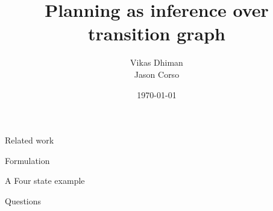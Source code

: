 \documentclass[10pt, compress]{beamer}
\title{Planning as inference over transition graph}
\date{\today}
\author{Vikas Dhiman \\ Jason Corso}
\institute{University of Michigan}
\begin{document}
\maketitle
\begin{frame}{Related work}
\end{frame}
\begin{frame}{Formulation}
\end{frame}

\begin{frame}{A Four state example}
\end{frame}

\begin{frame}{Questions}
\end{frame}
\end{document}
